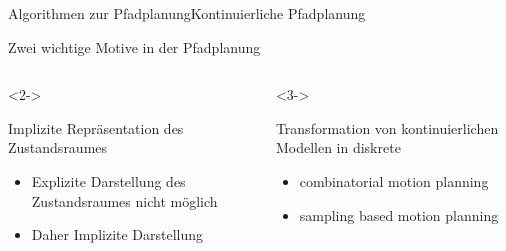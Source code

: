 \documentclass[t,aspectratio=169,dvipsnames]{beamer}
\begin{document}
\begin{frame}{Algorithmen zur Pfadplanung}{Kontinuierliche Pfadplanung}
	\begin{center}
		Zwei wichtige Motive in der Pfadplanung
	\end{center}
	\begin{columns}
		\begin{column}[T]{0.5\textwidth}<2->
			\begin{block}{Implizite Repräsentation des Zustandsraumes}
			\begin{itemize}
				\item Explizite Darstellung des Zustandsraumes nicht möglich
				\item Daher Implizite Darstellung
			\end{itemize}
			\end{block}
		\end{column}
		\begin{column}[T]{0.5\textwidth}<3->
			\begin{block}{Transformation von kontinuierlichen Modellen in diskrete}
			\begin{itemize}
				\item combinatorial motion planning
				\item sampling based motion planning
			\end{itemize}
			\end{block}
		\end{column}
	\end{columns}
\end{frame}
\end{document}

